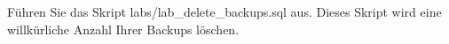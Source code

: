     \item Führen Sie das Skript labs/lab\_delete\_backups.sql aus. Dieses Skript wird eine will\-kür\-liche Anzahl Ihrer Backups löschen.
